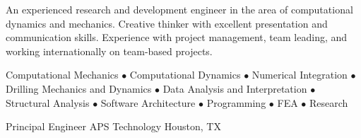 \documentclass{resume}
\begin{document}
	\thispagestyle{lefooterhorizontalline}
	\makeresumeheaderB
	
	An experienced research and development engineer in the area of computational dynamics and mechanics. Creative thinker with excellent presentation and communication skills. Experience with project management, team leading, and working internationally on team-based projects.

	Computational Mechanics $\bullet$ Computational Dynamics $\bullet$ Numerical Integration $\bullet$ Drilling Mechanics and Dynamics $\bullet$ Data Analysis and Interpretation $\bullet$ Structural Analysis $\bullet$ Software Architecture $\bullet$ Programming $\bullet$ FEA $\bullet$ Research

    
            {Principal Engineer}
            {APS Technology}
			{Houston, TX}
			
\end{document}
